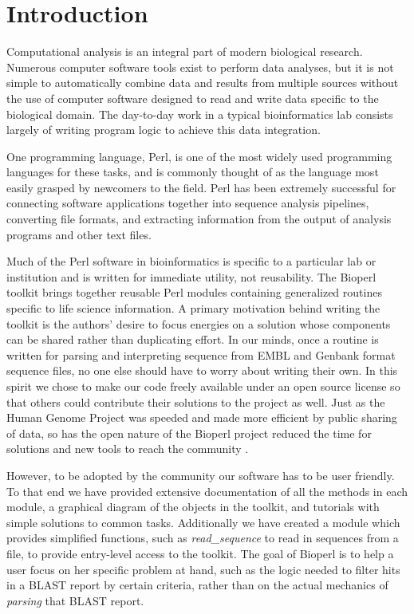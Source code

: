 \documentclass[12pt]{article}
\begin{document}
\section{Introduction}

Computational analysis is an integral part of modern biological
research.  Numerous computer software tools exist to perform data
analyses, but it is not simple to automatically combine data and
results from multiple sources without the use of computer software
designed to read and write data specific to the biological domain.
The day-to-day work in a typical bioinformatics lab consists largely
of writing program logic to achieve this data integration.

One programming language, Perl, is one of the most widely used
programming languages for these tasks, and is commonly thought of as
the language most easily grasped by newcomers to the field.  Perl has
been extremely successful for connecting software applications together into
sequence analysis pipelines, converting file formats, and extracting
information from the output of analysis programs and other text files.

Much of the Perl software in bioinformatics is specific to a
particular lab or institution and is written for immediate
utility, not reusability.  The Bioperl toolkit brings together
reusable Perl modules containing generalized routines specific to life
science information.  A primary motivation behind writing the toolkit
is the authors' desire to focus energies on a solution whose
components can be shared rather than duplicating effort.  In our
minds, once a routine is written for parsing and interpreting sequence
from EMBL and Genbank format sequence files, no one else should have
to worry about writing their own.  In this spirit we chose to make our
code freely available under an open source license
\cite{open-source-ref} so that others could contribute their solutions
to the project as well.  Just as the Human Genome Project was speeded
and made more efficient by public sharing of data, so has the open
nature of the Bioperl project reduced the time for solutions and new
tools to reach the community \cite{waterston}.

However, to be adopted by the community our software has to be user
friendly.  To that end we have provided extensive documentation
of all the methods in each module, a graphical diagram of the objects
in the toolkit, and tutorials with simple solutions to common tasks.
Additionally we have created a module which provides
simplified functions, such as \textit{read\_sequence} to read
in sequences from a file, to provide entry-level access to the toolkit.
The goal of Bioperl is to help a user focus
on her specific problem at hand, such as the logic needed to filter
hits in a BLAST \cite{blast} report by certain criteria, rather than
on the actual mechanics of \textit{parsing} that BLAST report.
\end{document}
